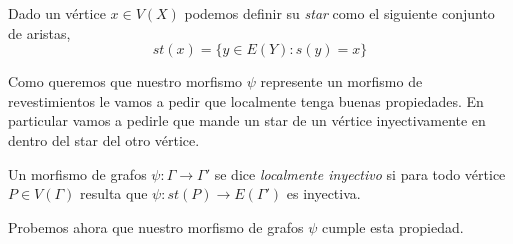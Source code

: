 \documentclass[tesis.tex]{subfiles}
\begin{document}
Dado un vértice $x \in V(X)$ podemos definir su \emph{star} como el siguiente conjunto de aristas,
\[
	st(x) = \{  y \in E(Y) : s(y) = x  \}
\]

Como queremos que nuestro morfismo $\psi$ represente un morfismo de revestimientos le vamos a pedir que localmente tenga buenas propiedades. 
En particular vamos a pedirle que mande un star de un vértice inyectivamente en dentro del star del otro vértice.

\begin{deff}
	Un morfismo de grafos $\psi:\Gamma \to \Gamma'$ se dice \emph{localmente inyectivo} si para todo vértice $P \in V(\Gamma)$ resulta que $\psi: st(P) \to E(\Gamma')$ es inyectiva. 
\end{deff}

Probemos ahora que nuestro morfismo de grafos $\psi$ cumple esta propiedad.
\end{document}
